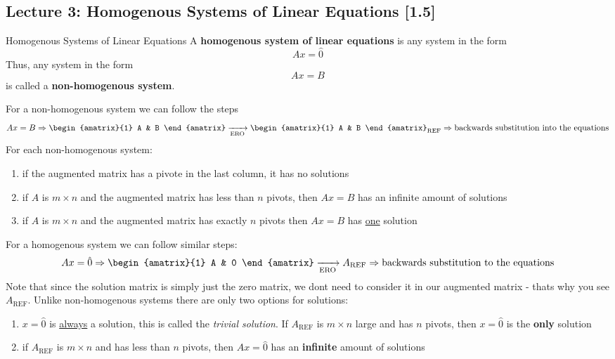 \subsection{Lecture 3: Homogenous Systems of Linear Equations [1.5]}\label{lecture:3}

\begin{defbox}{Homogenous Systems of Linear Equations}{}
    A \textbf{homogenous system of linear equations} is any system in the form 
    \[Ax = \hat{0}\]
    Thus, any system in the form \[Ax = B\] is called a \textbf{non-homogenous system}. 
\end{defbox}

For a non-homogenous system we can follow the steps
\[ Ax = B \Rightarrow \begin{amatrix}{1} A & B \end{amatrix} \xrightarrow[\text{ERO}]{} \begin{amatrix}{1} A & B \end{amatrix}_{\text{REF}} \Rightarrow \text{backwards substitution into the equations}\]
For each non-homogenous system:
\begin{enumerate}
    \item if the augmented matrix has a pivote in the last column, it has no solutions
    \item if $A$ is $m \times n$ and the augmented matrix has less than $n$ pivots, then $Ax=B$ has an infinite amount of solutions
    \item if $A$ is $m \times n$ and the augmented matrix has exactly $n$ pivots then $Ax=B$ has \underline{one} solution
\end{enumerate}
For a homogenous system we can follow similar steps:
\[Ax = \hat{0} \Rightarrow \begin{amatrix}{1} A & 0 \end{amatrix}\xrightarrow[\text{ERO}]{} A_{\text{REF}} \Rightarrow \text{backwards substitution to the equations}\]
Note that since the solution matrix is simply just the zero matrix, we dont need to consider it in our augmented matrix - thats why you see $A_\text{REF}$. Unlike non-homogenous systems there are only two options for solutions:
\begin{enumerate}
    \item $x=\hat{0}$ is \underline{always} a solution, this is called the \textit{trivial solution}. If $A_\text{REF}$ is $m \times n$ large and has $n$ pivots, then $x=\hat{0}$ is the \textbf{only} solution
    \item if $A_{\text{REF}}$ is $m \times n$ and has less than $n$ pivots, then $Ax=\hat{0}$ has an \textbf{infinite} amount of solutions
\end{enumerate}

